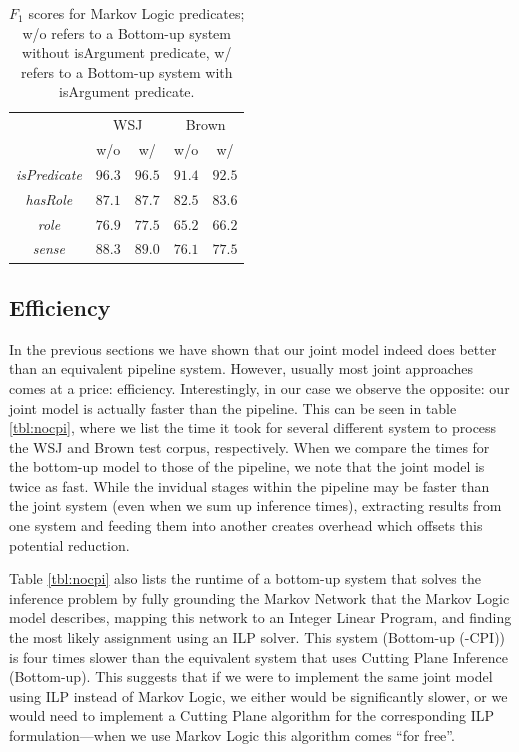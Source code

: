\begin{table}[ht]

    \centering
    \begin{tabular}{|c|c|c|c|c|}\hline
      & \multicolumn{2}{c|}{WSJ} & \multicolumn{2}{c|}{Brown}\\
                                  & w/o     & w/     & w/o    & w/  \\\hline 
        \emph{isPredicate}        & $96.3$  & $96.5$ & $91.4$ & $92.5$\\
        \emph{hasRole}            & $87.1$  & $87.7$ & $82.5$ & $83.6$ \\
        \emph{role}               & $76.9$  & $77.5$ & $65.2$ & $66.2$ \\
        \emph{sense}              & $88.3$  & $89.0$ & $76.1$ & $77.5$ \\\hline
    \end{tabular}
    \caption{$F_1$ scores for Markov Logic predicates; w/o refers to a Bottom-up system without isArgument predicate, w/ refers to a Bottom-up system with isArgument predicate.}
    \label{tbl:isArg}
\end{table}

\subsection{Efficiency}
In the previous sections we have shown that our joint model indeed does better than an equivalent pipeline system. However, usually most joint approaches comes at a price: efficiency. Interestingly, in our case we observe the opposite: our joint model is actually faster than the pipeline. This can be seen in table \ref{tbl:nocpi}, where we list the time it took for several different system to process the WSJ and Brown test corpus, respectively. When we compare the times for the bottom-up model to those of the pipeline, we note that the joint model is twice as fast. While the invidual stages within the pipeline may be faster than the joint system (even when we sum up inference times), extracting results from one system and feeding them into another creates overhead which offsets this potential reduction.  

Table \ref{tbl:nocpi} also lists the runtime of a bottom-up system that solves the inference problem by fully grounding the Markov Network that the Markov Logic model describes, mapping this network to an Integer Linear Program, and finding the most likely assignment using an ILP solver. This system (Bottom-up (-CPI)) is four times slower than the equivalent system that uses Cutting Plane Inference  (Bottom-up). This suggests that if we were to implement the same joint model using ILP instead of Markov Logic, we either would be significantly slower, or we would need to implement a Cutting Plane algorithm for the corresponding ILP formulation---when we use Markov Logic this algorithm comes ``for free''. 

